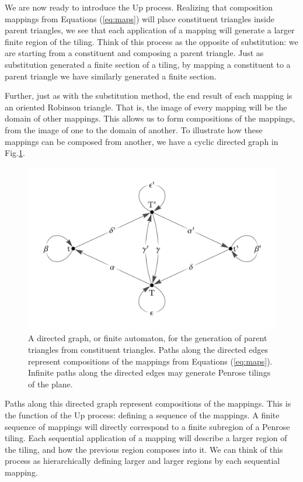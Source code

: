 \documentclass[
  oneside,
  11pt, a4paper,
  footinclude=true,
  headinclude=true,
  cleardoublepage=empty
]{scrbook}
\begin{document}
We are now ready to introduce the Up process. Realizing that composition mappings from Equations (\ref{eq:maps}) will place constituent triangles inside parent triangles, we see that each application of a mapping will generate a larger finite region of the tiling. Think of this process as the opposite of substitution: we are starting from a constituent and composing a  parent triangle. Just as substitution generated a finite section of a tiling, by mapping a constituent to a parent triangle we have similarly generated a finite section.

Further, just as with the substitution method, the end result of each mapping is an oriented Robinson triangle. That is, the image of every mapping will be the domain of other mappings. This allows us to form compositions of the mappings, from the image of one to the domain of another. To illustrate how these mappings can be composed from another, we have a cyclic directed graph in Fig.\ref{fig:UpDownGraph}.

\begin{figure}[H]
\centering
\includegraphics[width=\textwidth]{UpDownGraph}
\caption[Directed Graph of Composition Mappings]{A directed graph, or finite automaton, for the generation of parent triangles from constituent triangles. Paths along the directed edges represent compositions of the mappings from Equations (\ref{eq:maps}). Infinite paths along the directed edges may generate Penrose tilings of the plane.}
\label{fig:UpDownGraph}
\end{figure}

Paths along this directed graph represent compositions of the mappings. This is the function of the Up process: defining a sequence of the mappings. A finite sequence of mappings will directly correspond to a finite subregion of a Penrose tiling. Each sequential application of a mapping will describe a larger region of the tiling, and how the previous region composes into it. We can think of this process as hierarchically defining larger and larger regions by each sequential mapping.
\end{document}

